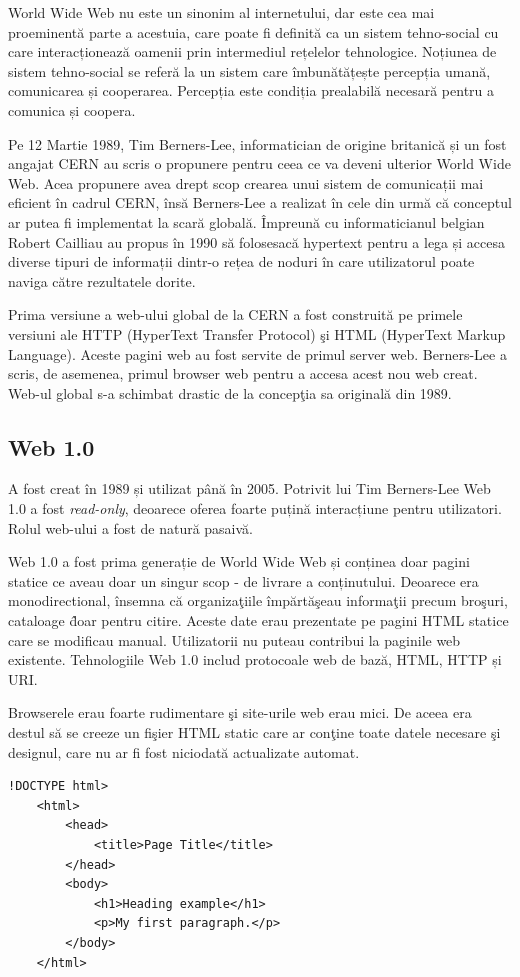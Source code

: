 \documentclass[12pt, a4paper]{report}
\begin{document}
World Wide Web nu este un sinonim al internetului, dar este cea mai proeminentă parte a acestuia, care poate fi definită ca un sistem tehno-social cu care interacționează oamenii prin intermediul rețelelor tehnologice. Noțiunea de sistem tehno-social se referă la un sistem care îmbunătățește percepția umană, comunicarea și cooperarea. Percepția este condiția prealabilă necesară pentru a comunica și coopera.

Pe 12 Martie 1989, Tim Berners-Lee, informatician de origine britanică și un fost angajat CERN au scris o propunere pentru ceea ce va deveni ulterior World Wide Web. Acea propunere avea drept scop crearea unui sistem de comunicații mai eficient în cadrul CERN, însă Berners-Lee a realizat în cele din urmă că conceptul ar putea fi implementat la scară globală. Împreună cu informaticianul belgian Robert Cailliau au propus în 1990 să folosesacă hypertext pentru a lega și accesa diverse tipuri de informații dintr-o rețea de noduri în care utilizatorul poate naviga către rezultatele dorite.

Prima versiune a web-ului global de la CERN a fost construit\u a pe primele versiuni ale HTTP (HyperText Transfer Protocol) \c si HTML (HyperText Markup Language). Aceste pagini web au fost servite de primul server web. Berners-Lee a scris, de asemenea, primul browser web pentru a accesa acest nou web creat. Web-ul global s-a schimbat drastic de la concep\c tia sa original\u a din 1989.

\subsection{Web 1.0}

A fost creat în 1989 și utilizat până în 2005. Potrivit lui Tim Berners-Lee Web 1.0 a fost \emph{read-only}, deoarece oferea foarte puțină interacțiune pentru utilizatori. Rolul web-ului a fost de natură pasaivă.

Web 1.0 a fost prima generație de World Wide Web și conținea doar pagini statice ce aveau doar un singur scop - de livrare a conținutului. Deoarece era monodirectional, \^ insemna c\u a organiza\c tiile \^ imp\u art\u a\c seau informa\c tii precum bro\c suri, cataloage \^ doar pentru citire. Aceste date erau prezentate pe pagini HTML statice care se modificau manual. Utilizatorii nu puteau contribui la paginile web existente. Tehnologiile Web 1.0 includ protocoale web de bază, HTML, HTTP și URI. \cite{web-1}

Browserele erau foarte rudimentare \c si site-urile web erau mici. De aceea era destul s\u a se creeze un fi\c sier HTML static care ar con\c tine toate datele necesare \c si designul, care nu ar fi fost niciodat\u a actualizate automat.
\begin{lstlisting}[caption={Exemplu fi\c sier HTML},captionpos=b]
	!DOCTYPE html>
	<html>
		<head>
			<title>Page Title</title>
		</head>
		<body>
			<h1>Heading example</h1>
			<p>My first paragraph.</p>
		</body>
	</html>
	
\end{lstlisting}
\end{document}
